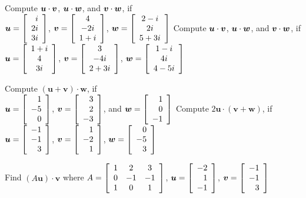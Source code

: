 \begin{enumerate}[!HW!, start=1]
\begin{multicols}{2}
\itemspade Compute $\bb u\cdot \bb v$, $\bb u\cdot \bb w$, and $\bb v\cdot \bb w$, if\\
$\bb u = \vr{i\\ 2i\\3i}$, $\bb v = \mtx{c}{4\\-2i\\ 1+i}$, $\bb w = \mtx{c}{2-i\\ 2i\\ 5+3i}$\columnbreak %
\itemspade Compute $\bb u\cdot \bb v$, $\bb u\cdot \bb w$, and $\bb v\cdot \bb w$, if\\
\mbox{}\hspace{-20 pt}$\bb u = \mtx{c}{1+i\\ 4\\ 3i}$, $\bb v = \mtx{c}{3\\-4i\\2+3i}$, $\bb w = \mtx{c}{1-i\\ 4i\\ 4-5i}$%
\end{multicols}

\begin{multicols}{2}
\itemspade Compute $(\boldsymbol{u} +  \boldsymbol{v}) \cdot \boldsymbol{w}$, if\\ $\boldsymbol{u} = \vr{ 1\\ -5\\ 0}$, $\boldsymbol{v} = \vr{ 3\\ 2\\ -3}$, and $\boldsymbol{w} = \vr{ 1\\ 0\\ -1}$\columnbreak %
\itemspade Compute $2\boldsymbol{u} \cdot ( \boldsymbol{v} + \boldsymbol{w})$, if\\ $\boldsymbol{u} = \vr{ -1\\ -1\\ 3}$, $\boldsymbol{v} = \vr{ 1\\ -2\\ 1}$, $\boldsymbol{w} = \vr{ 0\\ -5\\ 3}$ %
\end{multicols}
\itemspade Find $(A\boldsymbol{u})\cdot \boldsymbol{v}$ where $A= \mtx{ccc}{ 1&2&3\\ 0&-1&-1\\ 1&0&1}$, $\boldsymbol{u} = \vr{ -2\\ 1\\ -1}$, $\boldsymbol{v} = \vr{ -1\\ -1\\ 3}$ %


\end{enumerate}
